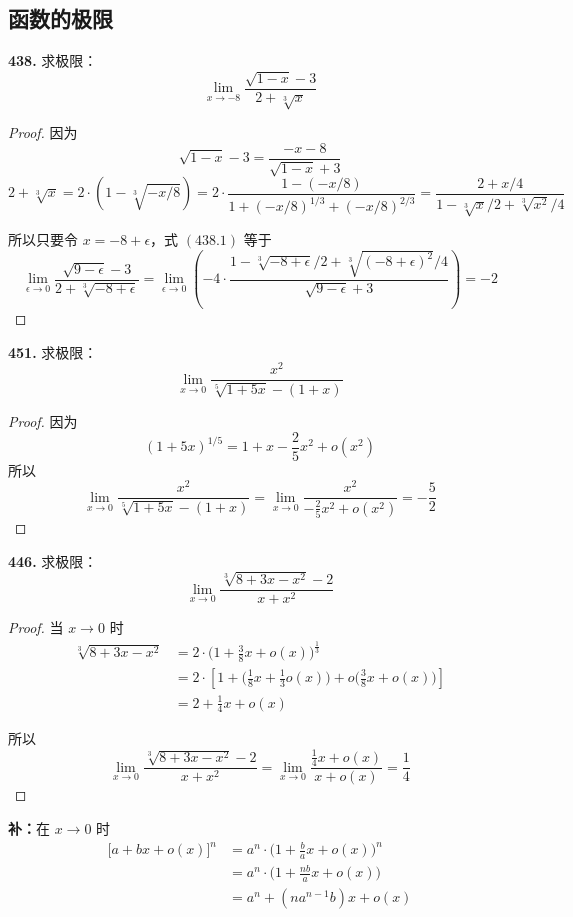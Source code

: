 \subsection{函数的极限}
\textbf{438.} 求极限：
\[\lim_{x \rightarrow -8} \frac{\sqrt{1 - x} - 3}{2 + \sqrt[3]{x}} \tag{438.1}\]
\begin{proof}
    因为
    \[\sqrt{1-x}-3 = \frac{-x-8}{\sqrt{1-x}+3} \tag{438.2}\]
    \[2 + \sqrt[3]{x} = 2 \cdot \left(1 - \sqrt[3]{-x/8}\right) = 2 \cdot \frac{1 - (-x/8)}{1 + (-x/8)^{1/3} + (-x/8)^{2/3}} = \frac{2 + x/4}{1-\sqrt[3]{x}/2+\sqrt[3]{x^2}/4} \tag{438.3}\]

    所以只要令 $x = -8 + \epsilon$，式 $(438.1)$ 等于
    \[\lim_{\epsilon \rightarrow 0} \frac{\sqrt{9 - \epsilon} - 3}{2 + \sqrt[3]{-8 + \epsilon}} = \lim_{\epsilon \rightarrow 0} \left(-4 \cdot \frac{1 - \sqrt[3]{-8 + \epsilon}/2 + \sqrt[3]{(-8+\epsilon)^2}/4}{\sqrt{9-\epsilon} + 3}\right) = -2\]
\end{proof}\vspace{9pt}

\textbf{451.} 求极限：
\[\lim_{x \rightarrow 0} \frac{x^2}{\sqrt[5]{1 + 5x} - (1 + x)}\]
\begin{proof}
    因为
    \[(1 + 5x)^{1/5} = 1 + x - \frac{2}{5} x^2 + o(x^2)\]
    所以
    \[\lim_{x \rightarrow 0} \frac{x^2}{\sqrt[5]{1+5x} - (1+x)} = \lim_{x \rightarrow 0} \frac{x^2}{-\frac{2}{5}x^2 + o(x^2)} = -\frac{5}{2}\]
\end{proof}\vspace{9pt}

\textbf{446.} 求极限：
\[\lim_{x \rightarrow 0} \frac{\sqrt[3]{8 + 3x - x^2} - 2}{x + x^2}\]
\begin{proof}
    当 $x \rightarrow 0$ 时
    \begin{align*}
        \sqrt[3]{8 + 3x - x^2} &= 2 \cdot \biggl(1 + \frac{3}{8}x + o(x)\biggr)^{\frac{1}{3}}\\
        &= 2 \cdot \left[1 + \biggl(\frac{1}{8}x + \frac{1}{3}o(x)\biggr) + o\biggl(\frac{3}{8}x + o(x)\biggr)\right]\\
        &= 2 + \frac{1}{4}x + o(x)
    \end{align*}
    
    所以
    \[\lim_{x \rightarrow 0} \frac{\sqrt[3]{8 + 3x - x^2} - 2}{x + x^2} = \lim_{x \rightarrow 0} \frac{\frac{1}{4}x + o(x)}{x + o(x)} = \frac{1}{4}\]
\end{proof}\vspace{9pt}

\textbf{补：}在 $x \rightarrow 0$ 时
\begin{align*}
    \bigl[a + bx + o(x)\bigr]^n &= a^n \cdot \biggl(1 + \frac{b}{a}x + o(x)\biggr)^n\\
    &= a^n \cdot \biggl(1 + \frac{nb}{a}x + o(x)\biggr)\\
    &= a^n + (na^{n-1}b)x + o(x)
\end{align*}\vspace{9pt}

